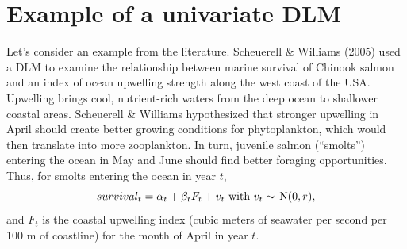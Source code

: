 \documentclass[10pt]{article}
\def\N{\,\textup{\textrm{N}}}
\begin{document}
\section{Example of a univariate DLM}
Let's consider an example from the literature. Scheuerell \& Williams (2005) used a DLM to examine the relationship between marine survival of Chinook salmon and an index of ocean upwelling strength along the west coast of the USA. Upwelling brings cool, nutrient-rich waters from the deep ocean to shallower coastal areas. Scheuerell \& Williams hypothesized that stronger upwelling in April should create better growing conditions for phytoplankton, which would then translate into more zooplankton. In turn, juvenile salmon (``smolts'') entering the ocean in May and June should find better foraging opportunities. Thus, for smolts entering the ocean in year $t$,
\begin{equation}\label{eqn:dlmSW1}
survival_t = \alpha_t + \beta_t F_t + v_t \text{ with } v_{t}\sim\N(0,r),
\end{equation}
and $F_t$ is the coastal upwelling index (cubic meters of seawater per second per 100 m of coastline) for the month of April in year $t$. 
\end{document}
